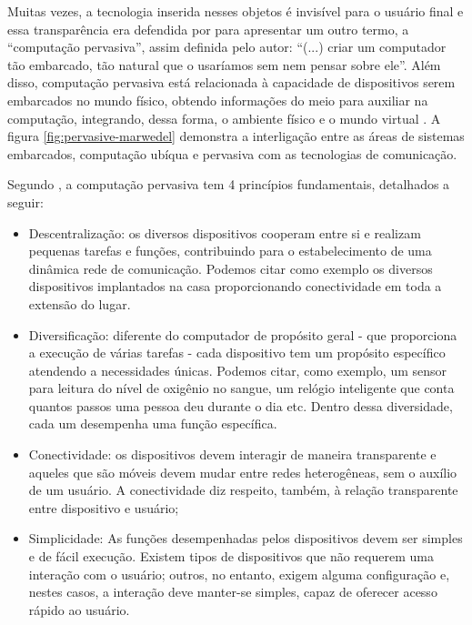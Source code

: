 
Muitas vezes, a tecnologia inserida nesses objetos é invisível para o usuário
final e essa transparência era defendida por  para
apresentar um outro termo, a ``computação pervasiva'', assim definida pelo
autor: ``(...) criar  um computador tão embarcado, tão natural que o usaríamos
sem nem pensar sobre ele''. Além disso, computação pervasiva está relacionada à
capacidade de dispositivos serem embarcados no mundo físico, obtendo
informações do meio para auxiliar na computação, integrando, dessa forma, o
ambiente físico e o mundo virtual \cite{bolsoni2009computaccao,
de2003computaccao}. A figura  \ref{fig:pervasive-marwedel} demonstra a
interligação entre as áreas de sistemas embarcados, computação ubíqua e
pervasiva com as tecnologias de comunicação.

Segundo , a computação pervasiva tem 4 princípios 
fundamentais, detalhados a seguir: 

\begin{itemize}
  \item Descentralização: os diversos dispositivos cooperam entre si e realizam
  pequenas tarefas e funções, contribuindo para o estabelecimento de uma 
  dinâmica rede de comunicação. Podemos citar como exemplo os diversos 
  dispositivos implantados na casa proporcionando conectividade em toda
  a extensão do lugar.

  \item Diversificação: diferente do computador de propósito geral - que 
  proporciona a execução de várias tarefas - cada dispositivo tem um propósito
  específico atendendo a necessidades únicas. Podemos citar, como exemplo, um
  sensor para leitura do nível de oxigênio no sangue, um relógio inteligente
  que conta quantos passos uma pessoa deu durante o dia etc. Dentro dessa 
  diversidade, cada um desempenha uma função específica.

  \item Conectividade: os dispositivos devem interagir de maneira transparente
  e aqueles que são móveis devem mudar entre redes heterogêneas, sem o 
  auxílio de um usuário. A conectividade diz respeito, também, à relação 
  transparente entre dispositivo e usuário; 

  \item Simplicidade: As funções desempenhadas pelos dispositivos devem ser
  simples e de fácil execução. Existem tipos de dispositivos que não requerem 
  uma interação com o usuário; outros, no entanto, exigem alguma configuração e,
  nestes casos, a interação deve manter-se simples, capaz de oferecer acesso
  rápido ao usuário. 

\end{itemize}

